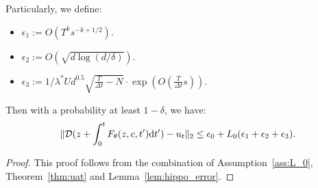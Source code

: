 \begin{theorem}
    Particularly, we define:
    \begin{itemize}
        \item $\epsilon_1 := O(T^k s^{-k+1/2})$.
        \item $\epsilon_2 := O(\sqrt{d\log(d/\delta)})$.
        \item $\epsilon_3 := 1/\lambda^* U d^{0.5} \sqrt{\frac{T}{\Delta t} - N} \cdot \exp(O(\frac{T}{\Delta t}s))$.
    \end{itemize}
    Then with a probability at least $1 - \delta$, we have:
    \begin{align*}
        \| {\cal D}(z + \int_0^{t} F_\theta(z, c, t') \mathrm{d} t') - u_t\|_2 \leq \epsilon_0 + L_0 (\epsilon_1 + \epsilon_2 + \epsilon_3).
    \end{align*}
\end{theorem}


\begin{proof}
    This proof follows from the combination of Assumption~\ref{ass:L_0}, Theorem~\ref{thm:uat} and Lemma~\ref{lem:hippo_error}.
\end{proof}